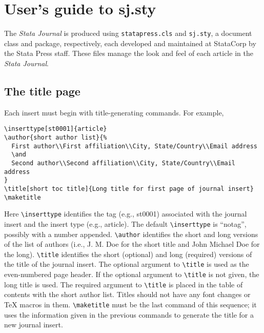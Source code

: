 
\section{User's guide to sj.sty}

The {\sl Stata Journal\/} is produced using \texttt{statapress.cls} and
\texttt{sj.sty}, a {\LaTeXe} document class and package, respectively, each
developed and maintained at StataCorp by the Stata Press staff.  These files
manage the look and feel of each article in the {\sl Stata Journal}.

\subsection{The title page}

Each insert must begin with title-generating commands.  For example,

\begin{stverbatim}
\begin{verbatim}
\inserttype[st0001]{article}
\author{short author list}{%
  First author\\First affiliation\\City, State/Country\\Email address
  \and
  Second author\\Second affiliation\\City, State/Country\\Email address
}
\title[short toc title]{Long title for first page of journal insert}
\maketitle
\end{verbatim}
\end{stverbatim}

Here \verb+\inserttype+ identifies the tag (e.g., st0001) associated
with the journal insert and the insert type (e.g., article).  The default
\verb+\inserttype+ is ``notag'', possibly with a number appended.
\verb+\author+ identifies the short and long versions of the list of
authors (i.e., J. M. Doe for the short title and John Michael Doe for the 
long).  \verb+\title+ identifies the short (optional) and long (required)
versions of the title of the journal insert.  The optional argument to
\verb+\title+ is used as the even-numbered page header.  If the optional
argument to \verb+\title+ is not given, the long title is used.  The required
argument to \verb+\title+ is placed in the table of contents with the short
author list.  Titles should not have any font changes or {\TeX} macros in
them.  \verb+\maketitle+ must be the last command of this sequence; it uses
the information given in the previous commands to generate the title for a new
journal insert.

